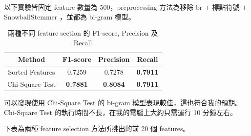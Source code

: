 \documentclass{article}[12pt]
\begin{document}
以下實驗皆固定 feature 數量為 500，preprocessing 方法為移除 br + 標點符號 + SnowballStemmer
，並都為 bi-gram 模型。

\begin{table}[H]
    \centering
    \caption{兩種不同 feature section 的 F1-score, Precision 及 Recall}
    \begin{tabular}{@{}cccc@{}}
    \toprule
    Method          & F1-score        & Precision       & Recall          \\ \midrule
    Sorted Features & 0.7259          & 0.7278          & \textbf{0.7911} \\
    Chi-Square Test & \textbf{0.7881} & \textbf{0.8084} & \textbf{0.7911} \\ \bottomrule
    \end{tabular}
\end{table}

可以發現使用 Chi-Square Test 的 bi-gram 模型表現較佳，這也符合我的預期。
Chi-Square Test 的執行時間不長，在我的電腦上大約只需運行 10 分鐘左右。

下表為兩種 feature selection 方法所挑出的前 20 個 features。
\end{document}
